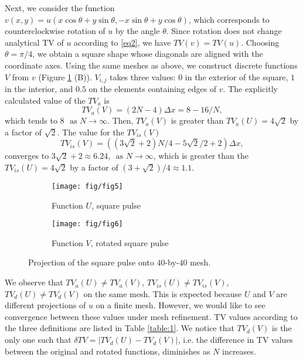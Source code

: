 \documentclass[reqno,a4paper,12pt]{amsart}
\begin{document}
Next, we consider the function $v(x,y) = u(x \cos{\theta} + y \sin{\theta}, -x \sin{\theta} + y \cos{\theta})$, which corresponds to counterclockwise rotation of $u$ by the angle $\theta$. Since rotation does not change analytical TV of $u$ according to \eqref{eq2}, we have $TV(v)  = TV(u)$. Choosing $\theta = \pi/4$, we obtain a square shape whose diagonals are aligned with the coordinate axes. Using the same meshes as above, we construct discrete functions $V$ from $v$ (Figure \ref{fig:1} (B)). $V_{i,j}$ takes three values: $0$ in the exterior of the square,  $1$ in the interior, and $0.5$ on the elements containing  edges of $v$. The explicitly calculated value of the $TV_a$ is
\begin{equation*}
    TV_a(V) = (2N-4) \Delta x = 8 - 16/N, 
\end{equation*}
which tends to $8$ $\text{ as } N \to \infty$. Then,  $TV_a(V)$ is greater than $TV_a(U) = 4 \sqrt{2}$ by a factor of $\sqrt{2}$. The value for the $TV_{is}(V)$
\begin{equation*}
    TV_{is}(V) = ((3 \sqrt{2} + 2) N / 4 - 5\sqrt{2}/2 + 2) \Delta x, 
\end{equation*}
converges to $3 \sqrt{2} + 2 \approx 6.24$, $\text{ as } N \to \infty$, which is greater than the $TV_{is}(U) =4 \sqrt{2}$ by a factor of $(3+\sqrt{2}) / 4 \approx 1.1$.
\begin{figure}[htb!]
\centering
     \begin{subfigure}[b]{0.45\textwidth}
         \centering
         \texttt{[image: fig/fig5]}
         \caption{Function $U$, square pulse}
     \end{subfigure}
     \begin{subfigure}[b]{0.45\textwidth}
         \centering
         \texttt{[image: fig/fig6]}
         \caption{Function $V$, rotated square pulse}
     \end{subfigure}
     \hfill
    
        \caption{Projection of the square pulse onto $40$-by-$40$ mesh.}
        \label{fig:1}
\end{figure}

We observe that $TV_a(U) \neq TV_a(V)$, $TV_{is}(U) \neq TV_{is}(V)$, $TV_d(U) \neq TV_d(V)$ on the same mesh. This is expected because $U$ and $V$ are  different projections of $u$ on a finite mesh. However, we would like to see convergence between these values under mesh refinement. TV values according to the three definitions are listed in Table \ref{table:1}. We notice that  $TV_d(V)$ is the only one such that $\delta  TV =\vert TV_d(U) - TV_d(V) \vert$, i.e. the difference in TV values between the original and rotated functions,  diminishes as $N$ increases. 
\end{document}
